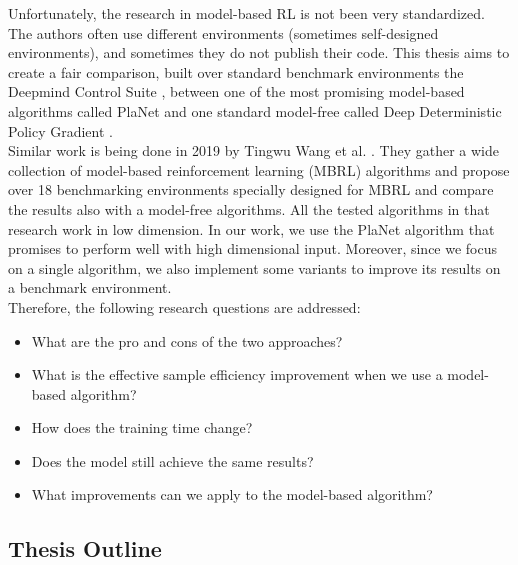 Unfortunately, the research in model-based RL is not been very standardized. The authors often use different environments (sometimes self-designed environments), and sometimes they do not publish their code. This thesis aims to create a fair comparison, built over standard benchmark environments the Deepmind Control Suite \cite{tassa2018deepmind}, between one of the most promising model-based algorithms called PlaNet \cite{hafner2019learning} and one standard model-free called Deep Deterministic Policy Gradient \cite{lillicrap2015continuous}. \\
Similar work is being done in 2019 by Tingwu Wang et al. \cite{langlois2019benchmarking}. They gather a wide collection of model-based reinforcement learning (MBRL) algorithms and propose over 18 benchmarking environments specially designed for MBRL and compare the results also with a model-free algorithms. All the tested algorithms in that research work in low dimension. In our work, we use the PlaNet algorithm that promises to perform well with high dimensional input. Moreover, since we focus on a single algorithm, we also implement some variants to improve its results on a benchmark environment.\\

Therefore, the following research questions are addressed:
\begin{itemize}
\item What are the pro and cons of the two approaches?  
\item What is the effective sample efficiency improvement when we use a model-based algorithm? 
\item How does the training time change? 
\item Does the model still achieve the same results? 
\item What improvements can we apply to the model-based algorithm?
\end{itemize}


\subsection{Thesis Outline}

